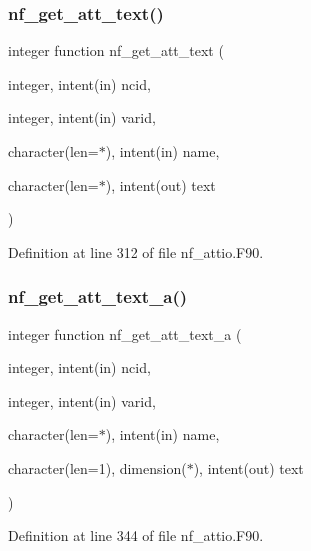\subsubsection{\texorpdfstring{nf\+\_\+get\+\_\+att\+\_\+text()}{nf\_get\_att\_text()}}
{\footnotesize\ttfamily integer function nf\+\_\+get\+\_\+att\+\_\+text (\begin{DoxyParamCaption}\item[{integer, intent(in)}]{ncid,  }\item[{integer, intent(in)}]{varid,  }\item[{character(len=$\ast$), intent(in)}]{name,  }\item[{character(len=$\ast$), intent(out)}]{text }\end{DoxyParamCaption})}



Definition at line 312 of file nf\+\_\+attio.\+F90.

\mbox{\label{nf__attio_8F90_afcd4d2a0409289eab4c4354afef06545}} 
\subsubsection{\texorpdfstring{nf\+\_\+get\+\_\+att\+\_\+text\+\_\+a()}{nf\_get\_att\_text\_a()}}
{\footnotesize\ttfamily integer function nf\+\_\+get\+\_\+att\+\_\+text\+\_\+a (\begin{DoxyParamCaption}\item[{integer, intent(in)}]{ncid,  }\item[{integer, intent(in)}]{varid,  }\item[{character(len=$\ast$), intent(in)}]{name,  }\item[{character(len=1), dimension($\ast$), intent(out)}]{text }\end{DoxyParamCaption})}



Definition at line 344 of file nf\+\_\+attio.\+F90.

\mbox{\label{nf__attio_8F90_ad608794165b454b88582bf994f472c39}} 
